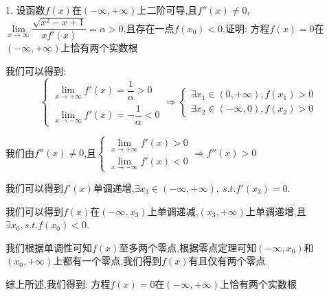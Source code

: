 1. 设函数$f(x)$在$(-\infty,+\infty)$上二阶可导,且$f''(x)\neq 0$,$\lim\limits_{x\to \infty}\dfrac{\sqrt{x^2-x+1}}{xf'(x)}=\alpha>0$,且存在一点$f(x_{0})<0$,证明:  方程$f(x)=0$在$(-\infty,+\infty)$上恰有两个实数根
\begin{solution}

	我们可以得到:  $$\left\lbrace
	\begin{array}{l}
		\lim\limits_{x\to+\infty}f'(x)=\dfrac{1}{\alpha}>0\\
		\lim\limits_{x\to-\infty}f'(x)=-\dfrac{1}{\alpha}<0
	\end{array}
	\right. \Rightarrow\left\lbrace
	\begin{array}{l}
		\exists x_{1}\in(0,+\infty),f(x_{1})>0\\
		\exists x_{2}\in(-\infty,0),f(x_{2})>0
	\end{array}
	\right. $$
	
	我们由$f''(x)\neq 0$,且$\left\lbrace
	\begin{array}{l}
		\lim\limits_{x\to+\infty}f'(x)>0\\
		\lim\limits_{x\to-\infty}f'(x)<0
	\end{array}
	\right. \Rightarrow f''(x)>0$
	
	我们可以得到$f'(x)$单调递增,$\exists x_{3}\in(-\infty,+\infty),\ s.t. f'(x_{3})=0$.
	
	我们可以得到$f(x)$在$(-\infty,x_{3})$上单调递减,$(x_{3},+\infty)$上单调递增,且$\exists x_{0},s.t. f(x_{0})<0$.
	
	我们根据单调性可知$f(x)$至多两个零点,根据零点定理可知$(-\infty,x_{0})$和$(x_{0},+\infty)$上都有一个零点,我们得到$f(x)$有且仅有两个零点.
	
	综上所述,我们得到:  方程$f(x)=0$在$(-\infty,+\infty)$上恰有两个实数根
\end{solution}

